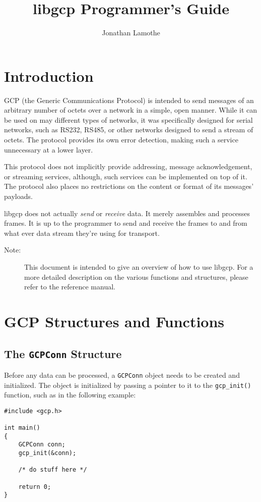 \documentclass{article}
\title{libgcp Programmer's Guide}
\author{Jonathan Lamothe}
\begin{document}
\maketitle
\tableofcontents
\clearpage

\section{Introduction}
GCP (the Generic Communications Protocol) is intended to send messages
of an arbitrary number of octets over a network in a simple, open
manner.  While it can be used on may different types of networks, it
was specifically designed for serial networks, such as RS232, RS485,
or other networks designed to send a stream of octets.  The protocol
provides its own error detection, making such a service unnecessary at
a lower layer.

This protocol does not implicitly provide addressing, message
acknowledgement, or streaming services, although, such services can be
implemented on top of it.  The protocol also places no restrictions on
the content or format of its messages' payloads.

libgcp does not actually \emph{send} or \emph{receive} data.  It
merely assembles and processes frames.  It is up to the programmer to
send and receive the frames to and from what ever data stream they're
using for transport.

\begin{description}
\item[Note:]This document is intended to give an overview of how to
  use libgcp.  For a more detailed description on the various
  functions and structures, please refer to the reference manual.
\end{description}

\section{GCP Structures and Functions}

\subsection{The \texttt{GCPConn} Structure}
Before any data can be processed, a \texttt{GCPConn} object needs to
be created and initialized.  The object is initialized by passing a
pointer to it to the \texttt{gcp\_init()} function, such as in the
following example:
\begin{verbatim}
#include <gcp.h>

int main()
{
    GCPConn conn;
    gcp_init(&conn);

    /* do stuff here */

    return 0;
}
\end{verbatim}
\end{document}
